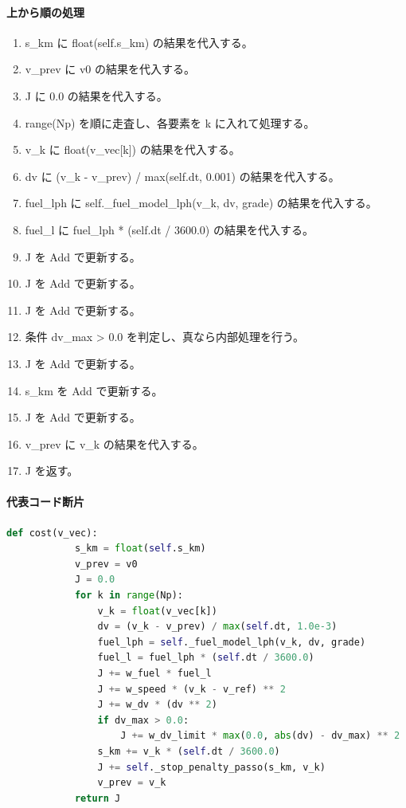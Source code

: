 \documentclass[a4paper,11pt]{article}
\begin{document}
            \paragraph{上から順の処理}
            \begin{enumerate}[leftmargin=1.8em]
            \item s\_km に float(self.s\_km) の結果を代入する。
\item v\_prev に v0 の結果を代入する。
\item J に 0.0 の結果を代入する。
\item range(Np) を順に走査し、各要素を k に入れて処理する。
\item   v\_k に float(v\_vec[k]) の結果を代入する。
\item   dv に (v\_k - v\_prev) / max(self.dt, 0.001) の結果を代入する。
\item   fuel\_lph に self.\_fuel\_model\_lph(v\_k, dv, grade) の結果を代入する。
\item   fuel\_l に fuel\_lph * (self.dt / 3600.0) の結果を代入する。
\item   J を Add で更新する。
\item   J を Add で更新する。
\item   J を Add で更新する。
\item   条件 dv\_max > 0.0 を判定し、真なら内部処理を行う。
\item     J を Add で更新する。
\item   s\_km を Add で更新する。
\item   J を Add で更新する。
\item   v\_prev に v\_k の結果を代入する。
\item J を返す。
            \end{enumerate}
            \paragraph{代表コード断片}
            \begin{lstlisting}[language=Python]
        def cost(v_vec):
            s_km = float(self.s_km)
            v_prev = v0
            J = 0.0
            for k in range(Np):
                v_k = float(v_vec[k])
                dv = (v_k - v_prev) / max(self.dt, 1.0e-3)
                fuel_lph = self._fuel_model_lph(v_k, dv, grade)
                fuel_l = fuel_lph * (self.dt / 3600.0)
                J += w_fuel * fuel_l
                J += w_speed * (v_k - v_ref) ** 2
                J += w_dv * (dv ** 2)
                if dv_max > 0.0:
                    J += w_dv_limit * max(0.0, abs(dv) - dv_max) ** 2
                s_km += v_k * (self.dt / 3600.0)
                J += self._stop_penalty_passo(s_km, v_k)
                v_prev = v_k
            return J
\end{lstlisting}
\end{document}
